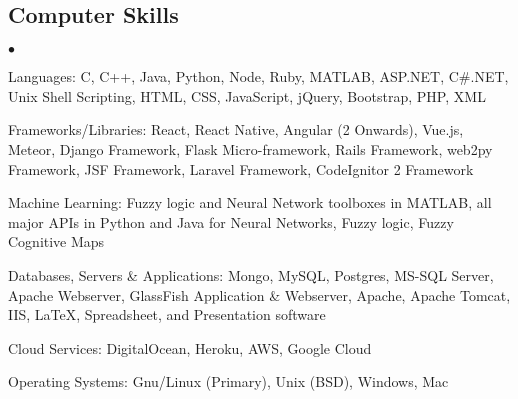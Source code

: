 \documentclass[margin,line]{res}
\newenvironment{list2}{
  \begin{list}{$\bullet$}{%
      \setlength{\itemsep}{0in}
      \setlength{\parsep}{0in} \setlength{\parskip}{0in}
      \setlength{\topsep}{0in} \setlength{\partopsep}{0in}
      \setlength{\leftmargin}{0.2in}}}{\end{list}}
\begin{document}
\begin{resume}
\section{\sc Computer Skills}
\begin{list2}
\item Languages:  C, C++, Java, Python, Node, Ruby, MATLAB, ASP.NET, C\#.NET, Unix Shell Scripting, HTML, CSS, JavaScript, jQuery, Bootstrap, PHP, XML\\
\item Frameworks/Libraries: React, React Native, Angular (2 Onwards), Vue.js, Meteor, Django Framework, Flask Micro-framework, Rails Framework, web2py Framework, JSF Framework, Laravel Framework, CodeIgnitor 2 Framework\\
\item Machine Learning: Fuzzy logic and Neural Network toolboxes in MATLAB, all major APIs in Python and Java for Neural Networks, Fuzzy logic, Fuzzy Cognitive Maps  
\item Databases, Servers \& Applications: Mongo, MySQL, Postgres, MS-SQL Server, Apache Webserver, GlassFish Application \& Webserver, Apache, Apache Tomcat, IIS, \LaTeX, Spreadsheet, and Presentation software\\
\item Cloud Services: DigitalOcean, Heroku, AWS, Google Cloud\\
\item Operating Systems:  Gnu/Linux (Primary), Unix (BSD), Windows, Mac\\
\end{list2}

\newpage


\end{resume}
\end{document}
